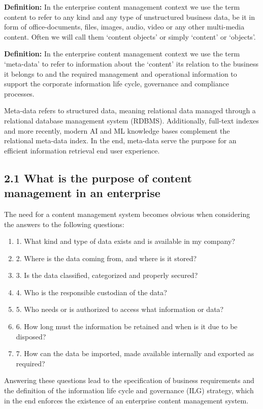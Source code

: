 \documentclass[EPiC]{easychair} %
\begin{document}
\textbf{Definition:} In the enterprise content management context we use the term content to refer to any kind and any type of unstructured business data, be it in form of office-documents, files, images, audio, video or any other multi-media content. Often we will call them ‘content objects’ or simply ‘content’ or ‘objects’. 

\textbf{Definition:} In the enterprise content management context we use the term ‘meta-data’ to refer to information about the ‘content’ its relation to the business it belongs to and the required management and operational information to support the corporate information life cycle, governance and compliance processes. 

Meta-data refers to structured data, meaning relational data managed through a relational database management system (RDBMS). Additionally, full-text indexes and more recently, modern AI and ML knowledge bases complement the relational meta-data index. In the end, meta-data serve the purpose for an efficient information retrieval end user experience.

\subsection{2.1	What is the purpose of content management in an enterprise}
The need for a content management system becomes obvious when considering the answers to the following questions:

\begin{enumerate}
    \item 1.	What kind and type of data exists and is available in my company?
    \item 2.	Where is the data coming from, and where is it stored? 
    \item 3.	Is the data classified, categorized and properly secured?
    \item 4.	Who is the responsible custodian of the data? 
    \item 5.	Who needs or is authorized to access what information or data? 
    \item 6.	How long must the information be retained and when is it due to be disposed?
    \item 7.	How can the data be imported, made available internally and exported as required?
\end{enumerate}

Answering these questions lead to the specification of business requirements and the definition of the information life cycle and governance (ILG) strategy, which in the end enforces the existence of an enterprise content management system. 
\end{document}
